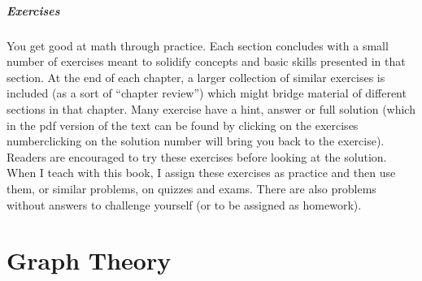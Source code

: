\documentclass[10pt,]{book}
\theoremstyle{plain}
\theoremstyle{definition}
\theoremstyle{definition}
\theoremstyle{definition}
\theoremstyle{definition}
\numberwithin{equation}{chapter}
\begin{document}
\paragraph[{Exercises}]{Exercises}\hypertarget{paragraphs-4}{}
\hypertarget{p-12}{}%
You get good at math through practice. Each section concludes with a small number of exercises meant to solidify concepts and basic skills presented in that section. At the end of each chapter, a larger collection of similar exercises is included (as a sort of ``chapter review'') which might bridge material of different sections in that chapter. Many exercise have a hint, answer or full solution (which in the pdf version of the text can be found by clicking on the exercises number\textemdash{}clicking on the solution number will bring you back to the exercise). Readers are encouraged to try these exercises before looking at the solution. When I teach with this book, I assign these exercises as practice and then use them, or similar problems, on quizzes and exams.  There are also problems without answers to challenge yourself (or to be assigned as homework).%
\setcounter{tocdepth}{2}
\renewcommand*\contentsname{Contents}
\tableofcontents
\mainmatter
\typeout{************************************************}
\typeout{************************************************}
\chapter[{Graph Theory}]{Graph Theory}\label{ch_graphtheory}
\typeout{************************************************}
\typeout{************************************************}
\end{document}
